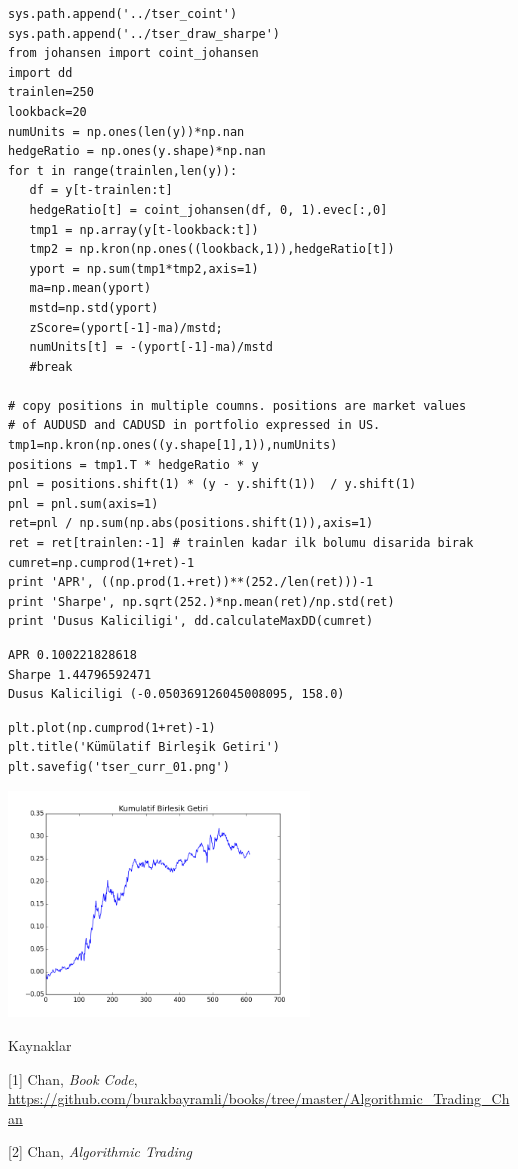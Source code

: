 \documentclass[12pt,fleqn]{article}\usepackage{../../common}
\begin{document}
\begin{verbatim}
sys.path.append('../tser_coint')
sys.path.append('../tser_draw_sharpe')
from johansen import coint_johansen
import dd
trainlen=250
lookback=20
numUnits = np.ones(len(y))*np.nan
hedgeRatio = np.ones(y.shape)*np.nan
for t in range(trainlen,len(y)):
   df = y[t-trainlen:t]
   hedgeRatio[t] = coint_johansen(df, 0, 1).evec[:,0]
   tmp1 = np.array(y[t-lookback:t])
   tmp2 = np.kron(np.ones((lookback,1)),hedgeRatio[t])
   yport = np.sum(tmp1*tmp2,axis=1)
   ma=np.mean(yport)
   mstd=np.std(yport)
   zScore=(yport[-1]-ma)/mstd;
   numUnits[t] = -(yport[-1]-ma)/mstd
   #break

# copy positions in multiple coumns. positions are market values 
# of AUDUSD and CADUSD in portfolio expressed in US.
tmp1=np.kron(np.ones((y.shape[1],1)),numUnits)
positions = tmp1.T * hedgeRatio * y
pnl = positions.shift(1) * (y - y.shift(1))  / y.shift(1)
pnl = pnl.sum(axis=1)
ret=pnl / np.sum(np.abs(positions.shift(1)),axis=1)
ret = ret[trainlen:-1] # trainlen kadar ilk bolumu disarida birak
cumret=np.cumprod(1+ret)-1
print 'APR', ((np.prod(1.+ret))**(252./len(ret)))-1
print 'Sharpe', np.sqrt(252.)*np.mean(ret)/np.std(ret)
print 'Dusus Kaliciligi', dd.calculateMaxDD(cumret)
\end{verbatim}

\begin{verbatim}
APR 0.100221828618
Sharpe 1.44796592471
Dusus Kaliciligi (-0.050369126045008095, 158.0)
\end{verbatim}

\begin{verbatim}
plt.plot(np.cumprod(1+ret)-1)
plt.title('Kümülatif Birleşik Getiri')
plt.savefig('tser_curr_01.png')
\end{verbatim}

\includegraphics[height=6cm]{tser_curr_01.png}


Kaynaklar 

[1] Chan, {\em Book Code}, \url{https://github.com/burakbayramli/books/tree/master/Algorithmic_Trading_Chan}

[2] Chan, {\em Algorithmic Trading}
\end{document}
